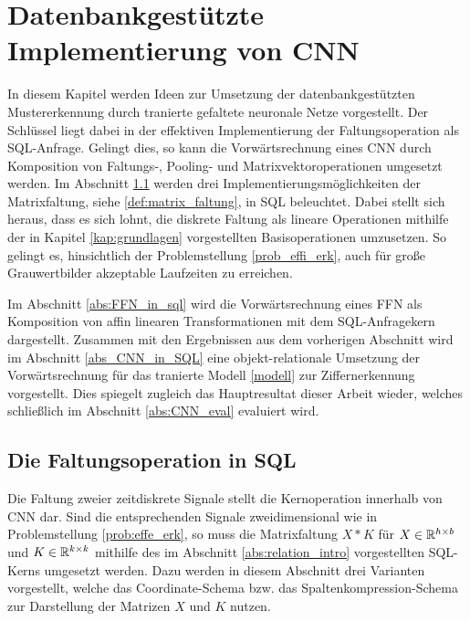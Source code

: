 \chapter{Datenbankgestützte Implementierung von CNN}
\label{kap:CNN_in_SQL}
In diesem Kapitel werden Ideen zur Umsetzung der datenbankgestützten Mustererkennung durch tranierte gefaltete neuronale Netze vorgestellt. Der Schlüssel liegt dabei in der effektiven Implementierung der Faltungsoperation als SQL-Anfrage. Gelingt dies, so kann die Vorwärtsrechnung eines CNN durch Komposition von Faltungs-, Pooling- und Matrixvektoroperationen umgesetzt werden. Im Abschnitt \ref{abs:conv_in_sql} werden drei Implementierungsmöglichkeiten der Matrixfaltung, siehe \ref{def:matrix_faltung}, in SQL beleuchtet. Dabei stellt sich heraus, dass es sich lohnt, die diskrete Faltung als lineare Operationen mithilfe der in Kapitel \ref{kap:grundlagen} vorgestellten Basisoperationen umzusetzen. So gelingt es, hinsichtlich der Problemstellung \ref{prob_effi_erk}, auch für große Grauwertbilder akzeptable Laufzeiten zu erreichen. 

Im Abschnitt \ref{abs:FFN_in_sql} wird die Vorwärtsrechnung eines FFN als Komposition von affin linearen Transformationen mit dem SQL-Anfragekern dargestellt. Zusammen mit den Ergebnissen aus dem vorherigen Abschnitt wird im Abschnitt \ref{abs_CNN_in_SQL} eine objekt-relationale Umsetzung der Vorwärtsrechnung für das tranierte Modell \ref{modell} zur Ziffernerkennung vorgestellt. Dies spiegelt zugleich das Hauptresultat dieser Arbeit wieder, welches schließlich im Abschnitt \ref{abs:CNN_eval} evaluiert wird. 
\section{Die Faltungsoperation in SQL}
\label{abs:conv_in_sql}
Die Faltung zweier zeitdiskrete Signale stellt die Kernoperation innerhalb von CNN dar. Sind die entsprechenden Signale zweidimensional wie in Problemstellung \ref{prob:effe_erk}, so muss die Matrixfaltung $X \ast K$ für $X \in \mathbb{R}^{h \times b}$ und $K \in \mathbb{R}^{k \times k}$ mithilfe des im Abschnitt \ref{abs:relation_intro} vorgestellten SQL-Kerns umgesetzt werden. Dazu werden in diesem Abschnitt drei Varianten vorgestellt, welche das Coordinate-Schema bzw. das Spaltenkompression-Schema zur Darstellung der Matrizen $X$ und $K$ nutzen. 
